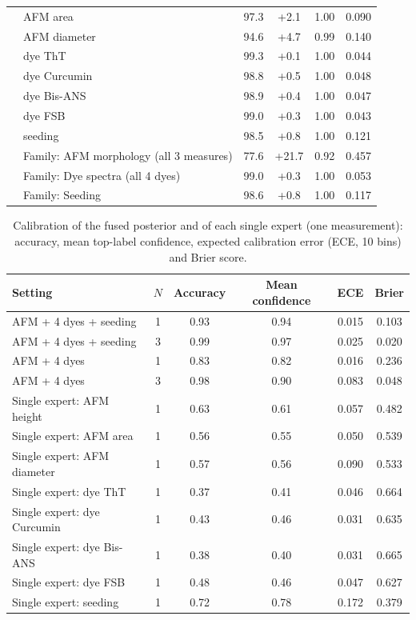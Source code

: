 \begin{table}[!htbp]
\begin{tabular}{llcccc}
 & AFM area & 97.3 & +2.1 & 1.00 & 0.090 \\
 & AFM diameter & 94.6 & +4.7 & 0.99 & 0.140 \\
 & dye ThT & 99.3 & +0.1 & 1.00 & 0.044 \\
 & dye Curcumin & 98.8 & +0.5 & 1.00 & 0.048 \\
 & dye Bis-ANS & 98.9 & +0.4 & 1.00 & 0.047 \\
 & dye FSB & 99.0 & +0.3 & 1.00 & 0.043 \\
 & seeding & 98.5 & +0.8 & 1.00 & 0.121 \\
 & Family: AFM morphology (all 3 measures) & 77.6 & +21.7 & 0.92 & 0.457 \\
 & Family: Dye spectra (all 4 dyes) & 99.0 & +0.3 & 1.00 & 0.053 \\
 & Family: Seeding & 98.6 & +0.8 & 1.00 & 0.117 \\
\bottomrule
\end{tabular}
\end{table}

\begin{table}[!htbp]
\centering\scriptsize
\caption{Calibration of the fused posterior and of each single expert (one measurement): accuracy, mean top-label confidence, expected calibration error (ECE, 10 bins) and Brier score.}\label{tab:s_calibration}
\begin{tabular}{lccccc}
\toprule
\textbf{Setting} & \textbf{$N$} & \textbf{Accuracy} & \textbf{Mean confidence} & \textbf{ECE} & \textbf{Brier} \\
\midrule
AFM + 4 dyes + seeding & 1 & 0.93 & 0.94 & 0.015 & 0.103 \\
AFM + 4 dyes + seeding & 3 & 0.99 & 0.97 & 0.025 & 0.020 \\
AFM + 4 dyes & 1 & 0.83 & 0.82 & 0.016 & 0.236 \\
AFM + 4 dyes & 3 & 0.98 & 0.90 & 0.083 & 0.048 \\
Single expert: AFM height & 1 & 0.63 & 0.61 & 0.057 & 0.482 \\
Single expert: AFM area & 1 & 0.56 & 0.55 & 0.050 & 0.539 \\
Single expert: AFM diameter & 1 & 0.57 & 0.56 & 0.090 & 0.533 \\
Single expert: dye ThT & 1 & 0.37 & 0.41 & 0.046 & 0.664 \\
Single expert: dye Curcumin & 1 & 0.43 & 0.46 & 0.031 & 0.635 \\
Single expert: dye Bis-ANS & 1 & 0.38 & 0.40 & 0.031 & 0.665 \\
Single expert: dye FSB & 1 & 0.48 & 0.46 & 0.047 & 0.627 \\
Single expert: seeding & 1 & 0.72 & 0.78 & 0.172 & 0.379 \\
\bottomrule
\end{tabular}
\end{table}

